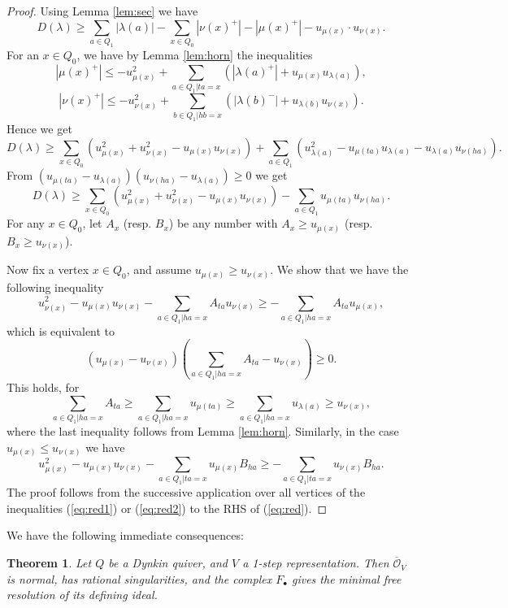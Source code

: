 \documentclass[twoside]{article}
\newcommand{\orb}{\mathcal{O}}
\newtheorem{theorem}{Theorem}[section]
\theoremstyle{definition}
\begin{document}
\begin{proof}
Using Lemma \ref{lem:sec} we have
$$D(\lambda)\geq \sum_{a\in Q_1} |\lambda(a)| - \sum_{x\in Q_0} |\nu(x)^+|-|\mu(x)^+|-u_{\mu(x)}\cdot u_{\nu(x)}.$$
For an $x\in Q_0$, we have by Lemma \ref{lem:horn} the inequalities
$$|\mu(x)^+|\leq -u_{\mu(x)}^2+\sum_{a\in Q_1 | ta=x} (|\lambda(a)^+|+u_{\mu(x)}u_{\lambda(a)}),$$
$$|\nu(x)^+|\leq -u_{\nu(x)}^2+\sum_{b\in Q_1 | hb=x} (|\lambda(b)^-|+u_{\lambda(b)}u_{\nu(x)}).$$
Hence we get
$$D(\lambda)\geq \sum_{x\in Q_0} (u_{\mu(x)}^2+u_{\nu(x)}^2-u_{\mu(x)} u_{\nu(x)})+\sum_{a\in Q_1} (u_{\lambda(a)}^2-u_{\mu(ta)}u_{\lambda(a)}-u_{\lambda(a)}u_{\nu(ha)}).$$
From $(u_{\mu(ta)}-u_{\lambda(a)})(u_{\nu(ha)}-u_{\lambda(a)})\geq 0$ we get
\begin{equation}
\label{eq:red} 
D(\lambda)\geq \sum_{x\in Q_0} (u_{\mu(x)}^2+u_{\nu(x)}^2-u_{\mu(x)} u_{\nu(x)})-\sum_{a\in Q_1} u_{\mu(ta)}u_{\nu(ha)}.
\end{equation}
For any $x\in Q_0$, let $A_x$ (resp. $B_x$) be any number with $A_x\geq u_{\mu(x)}$ (resp. $B_x\geq u_{\nu(x)}$). 

Now fix a vertex $x\in Q_0$, and assume $u_{\mu(x)}\geq u_{\nu(x)}$. We show that we have the following inequality
\begin{equation}
\label{eq:red1}
u_{\nu(x)}^2-u_{\mu(x)}u_{\nu(x)}-\sum_{a\in Q_1 | ha=x} A_{ta}u_{\nu(x)} \geq -\sum_{a\in Q_1 | ha=x} A_{ta}u_{\mu(x)},
\end{equation}
which is equivalent to 
$$(u_{\mu(x)}-u_{\nu(x)})(\sum_{a\in Q_1 | ha=x} A_{ta}-u_{\nu(x)})\geq 0.$$
This holds, for
$$\sum_{a\in Q_1 | ha=x} A_{ta}\geq \sum_{a\in Q_1 | ha=x}  u_{\mu(ta)}\geq \sum_{a\in Q_1 | ha=x}  u_{\lambda(a)}\geq u_{\nu(x)},$$
where the last inequality follows from Lemma \ref{lem:horn}. Similarly, in the case $u_{\mu(x)}\leq u_{\nu(x)}$ we have
\begin{equation}
\label{eq:red2}
u_{\mu(x)}^2-u_{\mu(x)}u_{\nu(x)}-\sum_{a\in Q_1 | ta=x} u_{\mu(x)}B_{ha} \geq -\sum_{a\in Q_1 | ta=x} u_{\nu(x)}B_{ha}.
\end{equation}
The proof follows from the successive application over all vertices of the inequalities (\ref{eq:red1}) or (\ref{eq:red2}) to the RHS of (\ref{eq:red}).
\end{proof}

We have the following immediate consequences:

\begin{theorem} Let $Q$ be a Dynkin quiver, and $V$ a 1-step representation. Then $\overline{\orb}_V$ is normal, has rational singularities, and the complex $F_\bullet$ gives the minimal free resolution of its defining ideal.
\end{theorem}
\end{document}
